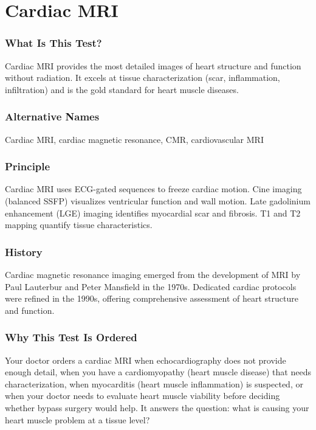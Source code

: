 \section{Cardiac MRI}


\subsubsection*{What Is This Test?}
Cardiac MRI provides the most detailed images of heart structure and function without radiation. It excels at tissue characterization (scar, inflammation, infiltration) and is the gold standard for heart muscle diseases.

\subsubsection*{Alternative Names}
Cardiac MRI, cardiac magnetic resonance, CMR, cardiovascular MRI


\subsubsection*{Principle}
Cardiac MRI uses ECG-gated sequences to freeze cardiac motion. Cine imaging (balanced SSFP) visualizes ventricular function and wall motion. Late gadolinium enhancement (LGE) imaging identifies myocardial scar and fibrosis. T1 and T2 mapping quantify tissue characteristics.

\subsubsection*{History}
Cardiac magnetic resonance imaging emerged from the development of MRI by Paul Lauterbur and Peter Mansfield in the 1970s. Dedicated cardiac protocols were refined in the 1990s, offering comprehensive assessment of heart structure and function.

\subsubsection*{Why This Test Is Ordered}
Your doctor orders a cardiac MRI when echocardiography does not provide enough detail, when you have a cardiomyopathy (heart muscle disease) that needs characterization, when myocarditis (heart muscle inflammation) is suspected, or when your doctor needs to evaluate heart muscle viability before deciding whether bypass surgery would help. It answers the question: what is causing your heart muscle problem at a tissue level?

